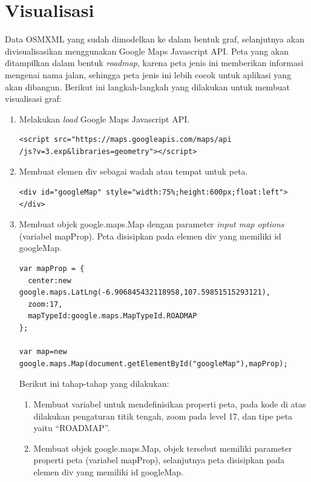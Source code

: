 \section{Visualisasi} \label{ssec:analisis_gmap}
Data OSMXML yang sudah dimodelkan ke dalam bentuk graf, selanjutnya akan
divisualisasikan menggunakan Google Maps Javascript API. Peta yang akan
ditampilkan dalam bentuk \textit{roadmap}, karena peta jenis ini memberikan 
informasi mengenai nama jalan, sehingga peta jenis ini lebih cocok untuk aplikasi 
yang akan dibangun. Berikut ini langkah-langkah yang dilakukan untuk membuat
visualisasi graf:
\begin{enumerate}
  \item Melakukan \textit{load} Google Maps Javascript API.
\begin{verbatim}
<script src="https://maps.googleapis.com/maps/api
/js?v=3.exp&libraries=geometry"></script>
\end{verbatim}

  \item Membuat elemen div sebagai wadah atau tempat untuk peta.
\begin{verbatim}
<div id="googleMap" style="width:75%;height:600px;float:left"></div>
\end{verbatim}
  
  \item Membuat objek google.maps.Map dengan parameter \textit{input map
  options} (variabel mapProp). Peta disisipkan pada elemen div yang memiliki id
  googleMap.
\begin{verbatim}
var mapProp = {
  center:new google.maps.LatLng(-6.906845432118958,107.59851515293121),
  zoom:17,
  mapTypeId:google.maps.MapTypeId.ROADMAP
};

var map=new google.maps.Map(document.getElementById("googleMap"),mapProp);
\end{verbatim}
  Berikut ini tahap-tahap yang dilakukan:
  \begin{enumerate}
    \item Membuat variabel untuk mendefinisikan properti peta, pada kode
    di atas dilakukan pengaturan titik tengah, zoom pada level 17, dan tipe peta
    yaitu ``ROADMAP''.
    
    \item Membuat objek google.maps.Map, objek tersebut memiliki parameter
    properti peta (variabel mapProp), selanjutnya peta disisipkan pada elemen
    div yang memiliki id googleMap.
  \end{enumerate}


\end{enumerate}
